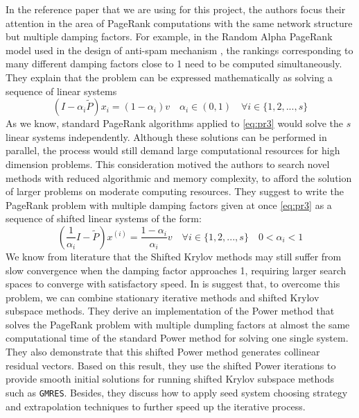 \documentclass[12pt]{article}
\begin{document}
\noindent In the reference paper that we are using for this project, the authors focus their attention in the area of PageRank computations with the same network structure but multiple damping factors. For example, in the Random Alpha PageRank model used in the design of anti-spam mechanism \cite{Constantine2009Random}, the rankings corresponding to many different damping factors close to 1 need to be computed simultaneously. They explain that the problem can be expressed mathematically as solving a sequence of linear systems
\begin{equation}\label{eq:pr3}
    (I - \alpha_i \tilde P)x_i = (1 - \alpha_i)v \quad  \alpha_i \in (0, 1) \quad \forall i \in \{1, 2, ..., s\}
\end{equation}
As we know, standard PageRank algorithms applied to \ref{eq:pr3} would solve the $s$ linear systems independently. Although these solutions can be performed in parallel, the process would still demand large computational resources for high dimension problems.
This consideration motived the authors to search novel methods with reduced algorithmic and memory complexity, to afford the solution of larger problems on moderate computing resources. They suggest to write the PageRank problem with multiple damping factors given at once \ref{eq:pr3} as a sequence of shifted linear systems of the form:
\begin{equation}
    (\frac{1}{\alpha_i}I - \tilde P)x^{(i)} = \frac{1 - \alpha_i}{\alpha_i}v \quad \forall i \in \{1, 2, ..., s\} \quad 0 < \alpha_i < 1
\end{equation}
We know from literature that the Shifted Krylov methods may still suffer from slow convergence when the damping factor approaches 1, requiring larger search spaces to converge with satisfactory speed. In \cite{SHEN2022126799} is suggest that, to overcome this problem, we can combine stationary iterative methods and shifted Krylov subspace methods. They derive an implementation of the Power method that solves the PageRank problem with multiple dumpling factors at almost the same computational time of the standard Power method for solving one single system. They also demonstrate that this shifted Power method generates collinear residual vectors. Based on this result, they use the shifted Power iterations to provide smooth initial solutions for running shifted Krylov subspace methods such as \texttt{GMRES}. Besides, they discuss how to apply seed system choosing strategy and extrapolation techniques to further speed up the iterative process.
\end{document}
